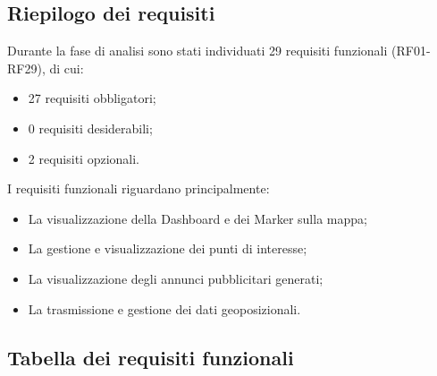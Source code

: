 \documentclass[10pt]{article}
\begin{document}
\subsection{Riepilogo dei requisiti}
Durante la fase di analisi sono stati individuati 29 requisiti funzionali (RF01-RF29), di cui:
\begin{itemize}
    \item 27 requisiti obbligatori;
    \item 0 requisiti desiderabili;
    \item 2 requisiti opzionali.
\end{itemize}

I requisiti funzionali riguardano principalmente:
\begin{itemize}
    \item La visualizzazione della Dashboard e dei Marker sulla mappa;
    \item La gestione e visualizzazione dei punti di interesse;
    \item La visualizzazione degli annunci pubblicitari generati;
    \item La trasmissione e gestione dei dati geoposizionali.
\end{itemize}

\subsection{Tabella dei requisiti funzionali}
\end{document}
